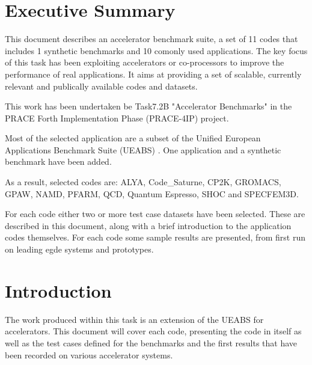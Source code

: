 \part*{Executive Summary}

This document describes an accelerator benchmark suite, a set of 11 codes that includes 1 synthetic benchmarks and 10 comonly used applications. The key focus of this task has been exploiting accelerators or co-processors to improve the performance of real applications. It aims at providing a set of scalable, currently relevant and publically available codes and datasets.

This work has been undertaken be Task7.2B "Accelerator Benchmarks" in the PRACE Forth Implementation Phase (PRACE-4IP) project.

Most of the selected application are a subset of the Unified European Applications Benchmark Suite (UEABS) \ref{}. One application and a synthetic benchmark have been added.

As a result, selected codes are: ALYA, Code_Saturne, CP2K, GROMACS,
GPAW, NAMD, PFARM, QCD, Quantum Espresso, SHOC and SPECFEM3D.

For each code either two or more test case datasets have been selected. These are described in
this document, along with a brief introduction to the application codes themselves. For each
code some sample results are presented, from first run on leading egde systems and prototypes.



\part{Introduction}
The work produced within this task is an extension of the UEABS for accelerators. This document will cover each code, presenting the code in itself as well as the test cases defined for the benchmarks and the first results that have been recorded on various accelerator systems.

